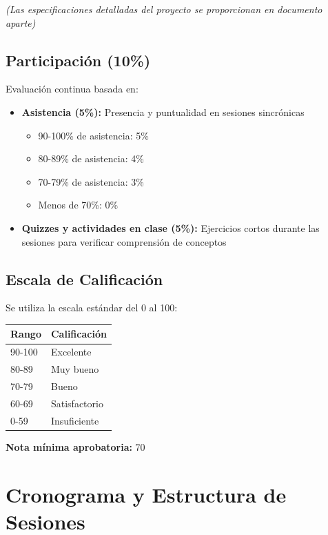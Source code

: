 \documentclass[12pt,letterpaper]{article}
\begin{document}
\textit{(Las especificaciones detalladas del proyecto se proporcionan en documento aparte)}

\subsection{Participación (10\%)}

Evaluación continua basada en:

\begin{itemize}[leftmargin=*]
    \item \textbf{Asistencia (5\%):} Presencia y puntualidad en sesiones sincrónicas
    \begin{itemize}
        \item 90-100\% de asistencia: 5\%
        \item 80-89\% de asistencia: 4\%
        \item 70-79\% de asistencia: 3\%
        \item Menos de 70\%: 0\%
    \end{itemize}
    
    \item \textbf{Quizzes y actividades en clase (5\%):} Ejercicios cortos durante las sesiones para verificar comprensión de conceptos
\end{itemize}

\subsection{Escala de Calificación}

Se utiliza la escala estándar del 0 al 100:

\begin{table}[h]
\centering
\begin{tabular}{ll}
\toprule
\textbf{Rango} & \textbf{Calificación} \\
\midrule
90-100 & Excelente \\
80-89 & Muy bueno \\
70-79 & Bueno \\
60-69 & Satisfactorio \\
0-59 & Insuficiente \\
\bottomrule
\end{tabular}
\end{table}

\textbf{Nota mínima aprobatoria:} 70

\newpage

\section{Cronograma y Estructura de Sesiones}
\end{document}
